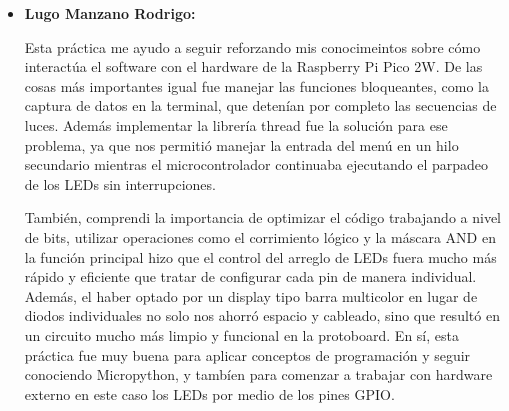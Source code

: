 \documentclass[letterpaper,12pt]{article}
\begin{document}
\begin{itemize}
        Ahora bien, para esto la parte de la terminal, fue un codigo sencillo donde lo tipico de usar fue arreglos para la comprobacion de las entradas, asi tambien como el uso de recorrimiento de bits para optimizar las lineas de codigo en zig-zag, debido que en las otras entradas solo usamos arreglos basicos debido a que solo teniamos que repetir secuencias que eran sencillas de representar para el arreglo de 8 bits guardandolos en tuplas para hacerlo mas sencillo para comprenderlo, al final de todo esto la ayuda de la compresion del multihilo y la parte del control del arreglo de 8 bits fue la logica principal en este proyecto que fue interesante y de gran ayuda para conocer nuevas cosas para micropython.
        
        
        \item \textbf{Lugo Manzano Rodrigo:} 

        Esta práctica me ayudo a seguir reforzando mis conocimeintos sobre cómo interactúa el software con el hardware de la Raspberry Pi Pico 2W. De las cosas más importantes igual fue manejar las funciones bloqueantes, como la captura de datos en la terminal, que detenían por completo las secuencias de luces. Además implementar la librería thread fue la solución para ese problema, ya que nos permitió manejar la entrada del menú en un hilo secundario mientras el microcontrolador continuaba ejecutando el parpadeo de los LEDs sin interrupciones.

        También, comprendi la importancia de optimizar el código trabajando a nivel de bits, utilizar operaciones como el corrimiento lógico y la máscara AND en la función principal hizo que el control del arreglo de LEDs fuera mucho más rápido y eficiente que tratar de configurar cada pin de manera individual. Además, el haber optado por un display tipo barra multicolor en lugar de diodos individuales no solo nos ahorró espacio y cableado, sino que resultó en un circuito mucho más limpio y funcional en la protoboard. En sí, esta práctica fue muy buena para aplicar conceptos de programación y seguir conociendo Micropython, y tambíen para comenzar a trabajar con hardware externo en este caso los LEDs por medio de los pines GPIO.
        

        
    \end{itemize}

    \newpage

    \nocite{*}
    \printbibliography[heading=bibintoc, title={Referencias}]
\end{document}
